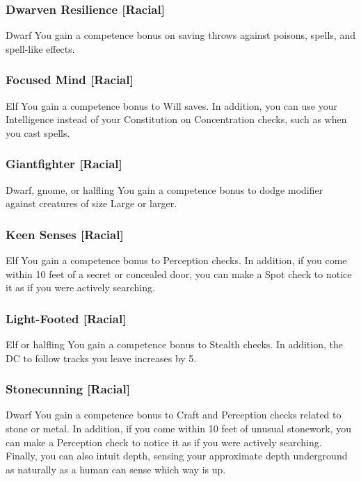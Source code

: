 \subsubsection{Dwarven Resilience [Racial]}
 Dwarf
 You gain a  competence bonus on saving throws against poisons, spells, and spell-like effects.

\subsubsection{Focused Mind [Racial]}
 Elf
 You gain a  competence bonus to Will saves. In addition, you can use your Intelligence instead of your Constitution on Concentration checks, such as when you cast spells.

\subsubsection{Giantfighter [Racial]}
 Dwarf, gnome, or halfling
 You gain a  competence bonus to dodge modifier against creatures of size Large or larger.

\subsubsection{Keen Senses [Racial]}
 Elf
 You gain a  competence bonus to Perception checks. In addition, if you come within 10 feet of a secret or concealed door, you can make a Spot check to notice it as if you were actively searching.

\subsubsection{Light-Footed [Racial]}
 Elf or halfling
 You gain a  competence bonus to Stealth checks. In addition, the DC to follow tracks you leave increases by 5.

\subsubsection{Stonecunning [Racial]}
 Dwarf
 You gain a  competence bonus to Craft and Perception checks related to stone or metal. In addition, if you come within 10 feet of unusual stonework, you can make a Perception check to notice it as if you were actively searching. Finally, you can also intuit depth, sensing your approximate depth underground as naturally as a human can sense which way is up.

